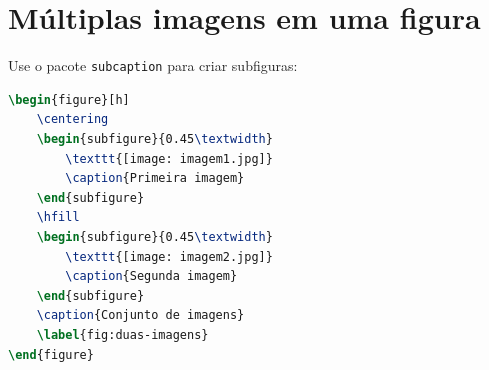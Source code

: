 \section{Múltiplas imagens em uma figura}

Use o pacote \verb|subcaption| para criar subfiguras:

\begin{lstlisting}[language=tex, caption=Exemplo de customização do tamanho e ângulo de imagem]
\begin{figure}[h]
    \centering
    \begin{subfigure}{0.45\textwidth}
        \texttt{[image: imagem1.jpg]}
        \caption{Primeira imagem}
    \end{subfigure}
    \hfill
    \begin{subfigure}{0.45\textwidth}
        \texttt{[image: imagem2.jpg]}
        \caption{Segunda imagem}
    \end{subfigure}
    \caption{Conjunto de imagens}
    \label{fig:duas-imagens}
\end{figure}
\end{lstlisting}

